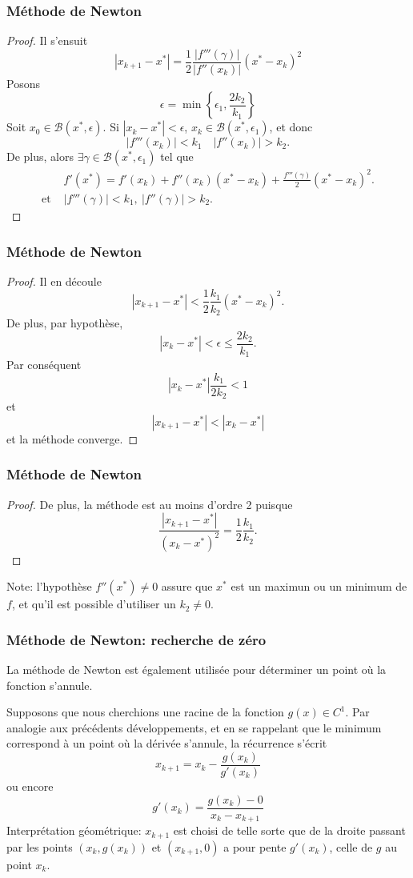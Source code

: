 \documentclass[t,usepdftitle=false]{beamer}
\def\blue{\color{blue}}
\def\cB{\mathcal{B}}
\begin{document}
\begin{frame}
\frametitle{Méthode de Newton}
	
\begin{proof}
Il s'ensuit
$$
|x_{k+1}-x^*| = \frac{1}{2}\frac{|f'''(\gamma)|}{|f''(x_k)|}(x^*-x_k)^2
$$
Posons
$$
\epsilon = \min \left\lbrace \epsilon_1, \frac{2k_2}{k_1} \right\rbrace
$$
Soit $x_0 \in \cB(x^*, \epsilon)$.
Si $| x_k - x^*| < \epsilon$, $x_k \in \cB(x^*, \epsilon_1)$, et donc
$$
| f'''(x_k) | < k_1 \quad | f''(x_k) | > k_2. 
$$
De plus, alors $\exists \gamma \in \cB(x^*,\epsilon_1)$ tel que
\begin{align*}
& f'(x^*) = f'(x_k) + f''(x_k)(x^*-x_k)+\frac{f'''(\gamma)}{2}(x^*-x_k)^2. \\
\mbox{et } & | f'''(\gamma) | < k_1,\ | f''(\gamma) | > k_2. 
\end{align*}
\end{proof}

\end{frame}

\begin{frame}
\frametitle{Méthode de Newton}

\begin{proof}
Il en découle
$$
|x_{k+1}-x^*| < \frac{1}{2}\frac{k_1}{k_2}(x^*-x_k)^2.
$$
De plus, par hypothèse,
$$
|x_k-x^*| < \epsilon \leq \frac{2k_2}{k_1}.
$$
Par conséquent
$$
|x_k-x^*| \frac{k_1}{2k_2} < 1
$$
et
$$
|x_{k+1}-x^*| < |x_k - x^*|
$$
et la méthode converge.
\end{proof}

\end{frame}

\begin{frame}
\frametitle{Méthode de Newton}

\begin{proof}
De plus, la méthode est au moins d'ordre 2 puisque
$$
\frac{|x_{k+1}-x^*|}{(x_k-x^*)^2} = \frac{1}{2}\frac{k_1}{k_2}.
$$
\end{proof}

{\blue Note}: l'hypothèse $f''(x^*) \ne 0$ assure que $x^*$ est un maximun ou un
minimum de $f$, et qu'il est possible d'utiliser un $k_2 \ne 0$.

\end{frame}

\begin{frame}
\frametitle{Méthode de Newton: recherche de zéro}

La méthode de Newton est également utilisée pour déterminer un point où la fonction
s'annule.

\mbox{}

Supposons que nous cherchions une racine de la fonction $g(x) \in C^1$.
Par analogie aux précédents développements, et en se rappelant que le minimum correspond à un point où la dérivée s'annule, la récurrence s'écrit
\[
x_{k+1} = x_k - \frac{g(x_k)}{g'(x_k)}
\]
ou encore
$$
g'(x_k) = \frac{g(x_k) - 0}{x_k - x_{k+1}}
$$
Interprétation géométrique: $x_{k + 1}$ est choisi de telle sorte que de la droite passant par les
points $(x_k, g(x_k))$ et $(x_{k + 1}, 0)$ a pour pente $g'(x_k)$, celle de $g$ au point $x_k$.

\end{frame}
\end{document}

